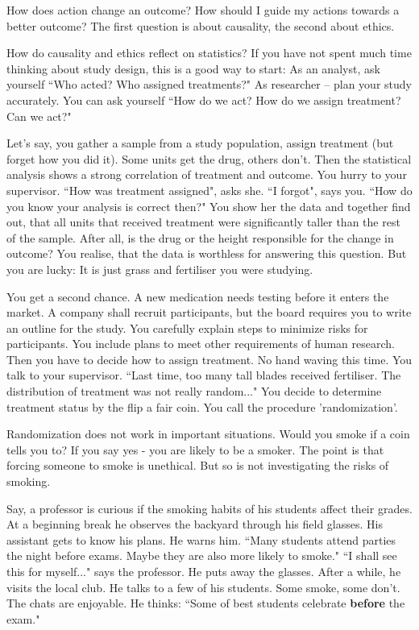 How does action change an outcome?
How should I guide my actions towards a better outcome?
The first question is about causality, the second about ethics.

How do causality and ethics reflect on statistics?
If you have not spent much time thinking about study design, this is a good way to start: 
As an analyst, ask yourself “Who acted? Who assigned treatments?"
As researcher -- plan your study accurately. You can ask yourself “How do we act? How do we assign treatment? Can we act?"

Let's say, you gather a sample from a study population, assign treatment (but forget how you did it). Some units get the drug, others don't. Then the statistical analysis shows a strong correlation of treatment and outcome. You hurry to your supervisor. “How was treatment assigned", asks she. “I forgot", says you.
“How do you know your analysis is correct then?"
You show her the data and together find out, that all units that received treatment were significantly taller than the rest of the sample.
After all, is the drug or the height responsible for the change  in outcome?
You realise, that the data is worthless for answering this question.
But you are lucky: It is just grass and fertiliser you were studying.

You get a second chance. A new medication needs testing before it enters the market. 
A company shall recruit participants, but the board requires you to write an outline for the study.
You carefully  explain steps to minimize risks for participants. You include plans to meet other requirements of human research.
Then you have to decide how to assign treatment.
No hand waving this time. You talk to your supervisor.
“Last time, too many tall blades received fertiliser. The distribution of treatment was not really random..."
You decide to determine treatment status by the flip a fair coin.
You call the procedure 'randomization'.

Randomization does not work in important situations. Would you smoke if a coin tells you to? If you say yes - you are likely to be a smoker. The point is that forcing someone to smoke is unethical. But so is not investigating the risks of smoking.

Say, a professor is curious if the smoking habits of his students affect their grades. 
At a beginning break he observes the backyard through his field glasses.
His assistant gets to know his plans. He warns him. “Many students attend parties the night before exams. Maybe they are also more likely to smoke." “I shall see this for myself..." says the professor. He puts away the glasses. After a while, he visits the local club.
He talks to a few of his students. Some smoke, some don't. The chats are enjoyable. He thinks: “Some of best students celebrate \textbf{before} the exam."

